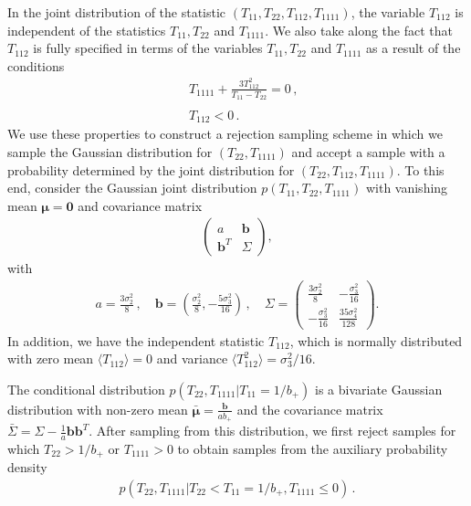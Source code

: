 \documentclass[a4paper, 11pt]{article}
\begin{document}
In the joint distribution of the statistic $(T_{11},T_{22},T_{112},T_{1111})$, the variable $T_{112}$ is independent of the statistics $T_{11}, T_{22}$ and $T_{1111}$. We also take along the fact that $T_{112}$ is fully specified in terms of the variables $T_{11},T_{22}$ and $T_{1111}$ as a result of the conditions
\begin{align}
  &T_{1111}+\frac{3T_{112}^2}{T_{11}-T_{22}}=0\,,\\
  \ \\
  &T_{112}<0\,.
\end{align}
We use these properties to construct a rejection sampling scheme in which we sample the Gaussian distribution for $(T_{22},T_{1111})$ and accept a sample with a probability determined by the joint distribution for $(T_{22},T_{112},T_{1111})$. To this end, consider the Gaussian joint
distribution $p(T_{11},T_{22},T_{1111})$ with vanishing mean $\bm{\mu}=\bm{0}$ and covariance matrix
\begin{align}
  \begin{pmatrix} a & \bm{b} \\ \bm{b}^T & \Sigma \end{pmatrix},
\end{align}
with
\begin{align}
a=\frac{3 \sigma_2^2}{8}\,, \quad
\bm{b}=\left(\frac{\sigma_2^2}{8}, -\frac{5 \sigma_3^2}{16}\right)\,,\quad
\Sigma = \begin{pmatrix} \frac{3 \sigma_2^2}{8} & -\frac{\sigma_3^2}{16} \\ -\frac{\sigma_3^2}{16} & \frac{35 \sigma_4^2}{128}\end{pmatrix}.
  \end{align}
In addition, we have the independent statistic $T_{112}$, which is normally distributed with zero mean $\langle T_{112}\rangle = 0$ and variance $\langle T_{112}^2\rangle = \sigma_3^2/16$.

\bigskip
The conditional distribution $p(T_{22},T_{1111}|T_{11}=1/b_+)$ is a bivariate Gaussian distribution with non-zero mean $\bar{\bm{\mu}}=\frac{\bm{b}}{a b_+}$ and the covariance matrix $\bar{\Sigma}=\Sigma -\frac{1}{a} \bm{b}\bm{b}^T$. After sampling from this distribution, we first reject samples for which $T_{22}>1/b_+$ or $T_{1111}>0$ to obtain samples from the auxiliary probability density 
\begin{align}
p(T_{22},T_{1111}| T_{22} < T_{11}=1/b_+,T_{1111}\leq 0)\,.
\end{align}
\end{document}
